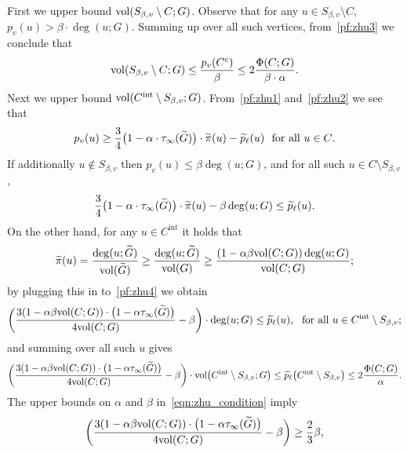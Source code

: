 First we upper bound $\mathrm{vol}(S_{\beta,v} \setminus C;G)$. Observe that for any $u \in S_{\beta,v} \setminus C$, $p_v(u) > \beta \cdot \deg(u;G)$. Summing up over all such vertices, from~\eqref{pf:zhu3} we conclude that
\begin{equation}
\label{pf:zhu3.5}
\mathrm{vol}(S_{\beta,v} \setminus C; G) \leq \frac{p_v(C^c)}{\beta} \leq 2\frac{\Phi(C;G)}{\beta \cdot \alpha}.
\end{equation} 
Next we upper bound $\mathrm{vol}(C^{\mathrm{int}} \setminus S_{\beta,v};G)$. From~\eqref{pf:zhu1} and~\eqref{pf:zhu2} we see that 
\begin{equation*}
p_v(u) \geq \frac{3}{4}\bigl(1 - \alpha \cdot \tau_{\infty}(\widetilde{G})\bigr) \cdot \widetilde{\pi}(u) - \widetilde{p}_{\ell}(u)~~\textrm{for all $u \in C$.}
\end{equation*}
If additionally $u \not\in S_{\beta,v}$ then $p_v(u) \leq \beta \deg(u;G)$, and for all such $u \in C \setminus S_{\beta,v}$,
\begin{equation}
\label{pf:zhu4}
\frac{3}{4}\bigl(1 - \alpha \cdot \tau_{\infty}(\widetilde{G})\bigr) \cdot \widetilde{\pi}(u) -  \beta\deg(u;G) \leq \widetilde{p}_{\ell}(u).
\end{equation}
On the other hand, for any $u \in C^{\mathrm{int}}$ it holds that
\begin{equation*}
\widetilde{\pi}(u) = \frac{\deg(u;\widetilde{G})}{\mathrm{vol}(\widetilde{G})} \geq \frac{\deg(u;\widetilde{G})}{\mathrm{vol}(G)} \geq \frac{(1 - \alpha \beta \mathrm{vol}(C;G))\deg(u;G)}{\mathrm{vol}(C;G)};
\end{equation*}
by plugging this in to~\eqref{pf:zhu4} we obtain
\begin{equation*}
\biggl(\frac{3(1 - \alpha \beta \mathrm{vol}(C;G))\cdot\bigl(1 - \alpha \tau_{\infty}(\widetilde{G})\bigr)}{4\mathrm{vol}(C;G)} - \beta\biggr) \cdot \deg(u;G) \leq \widetilde{p}_{\ell}(u),~~\textrm{for all $u \in C^{\mathrm{int}} \setminus S_{\beta,v}$};
\end{equation*}
and summing over all such $u$ gives
\begin{equation*}
\biggl(\frac{3(1 - \alpha \beta \mathrm{vol}(C;G))\cdot\bigl(1 - \alpha \tau_{\infty}(\widetilde{G})\bigr)}{4\mathrm{vol}(C;G)} - \beta\biggr) \cdot \mathrm{vol}\bigl(C^{\mathrm{int}} \setminus S_{\beta,v}; G\bigr) \leq \widetilde{p}_{\ell}\bigl(C^{\mathrm{int}} \setminus S_{\beta,v}\bigr) \leq 2\frac{\Phi(C;G)}{\alpha}.
\end{equation*}
The upper bounds on $\alpha$ and $\beta$ in~\eqref{eqn:zhu_condition} imply
\begin{equation*}
\biggl(\frac{3(1 - \alpha \beta \mathrm{vol}(C;G))\cdot\bigl(1 - \alpha \tau_{\infty}(\widetilde{G})\bigr)}{4\mathrm{vol}(C;G)} - \beta\biggr) \geq \frac{2}{3}\beta,
\end{equation*}

